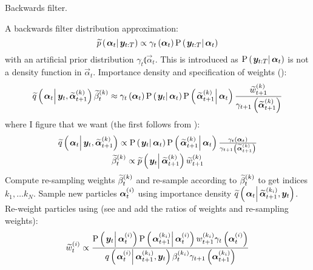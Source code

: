 \begin{algorithm}
\caption{Backwards filter.}\label{alg:backward}
\begin{algorithmic}[1]\raggedright
\INPUT
\Statex A backwards filter distribution approximation:
\begin{equation}
	\propAproxC{\vec{\alpha}_t}{\vec{y}_{t:T}} \propto \gamma_t \Lparen{\vec{\alpha}_t}\propC{\vec{y}_{t:T}}{\vec{\alpha}_t}
\end{equation} 
\Statex with an  artificial prior distribution $\gamma_t \Lparen{\vec{\alpha}_t}$. This is introduced as $\propC{\vec{y}_{t:T}}{\vec{\alpha}_t}$ is not a density function in $\vec{\alpha}_t$.
\Statex Importance density and specification of weights {\footnotesize (\citet[page 451 -- maybe look in the example in the appendix]{fearnhead10})}:
\Statex\begin{equation}
	\IDAproxC{\vec{\alpha}_t}{\vec{y}_t, \particB{\vec{\alpha}}{t + 1}{k}}\particB{\beta}{t}{k} \approx %
		\gamma_t\Lparen{\vec{\alpha}_t}
		\propC{\vec{y}_t}{\vec{\alpha}_t}
		\propC{\particB{\vec{\alpha}}{t + 1}{k}}{\vec{\alpha}_t}
		\frac{\particB{w}{t + 1}{k}}{\gamma_{t + 1}\Lparen{\particB{\vec{\alpha}}{t + 1}{k}}}
\end{equation}
\Statex where I figure that we want {\footnotesize (the first follows from \citet[page 74]{briers10})}:
\Statex\begin{equation}\begin{matrix}
	\IDAproxC{\vec{\alpha}_t}{\vec{y}_t, \particB{\vec{\alpha}}{t + 1}{k}} \propto %
		\propC{\vec{y}_t}{\vec{\alpha}_t}
		\propC{\particB{\vec{\alpha}}{t + 1}{k}}{\vec{\alpha}_t}
		\frac{\gamma_t\Lparen{\vec{\alpha}_t}}{\gamma_{t + 1}\Lparen{\particB{\vec{\alpha}}{t + 1}{k}}} \\
	\particB{\beta}{t}{k} \propto %
		 \propAproxC{\vec{y}_t}{\particB{\vec{\alpha}}{t + 1}{k}}\particB{w}{t + 1}{k}
\end{matrix}\end{equation}
\State Compute re-sampling weights $\widetilde{\beta}_{t}^{\left( k\right)}$ and re-sample according to $\widetilde{\beta}_{t}^{\left( k\right)}$ to get indices $k_1,\dots k_N$.
\EndProcedure
%
\State Sample new particles $\bm{\alpha}_{t}^{\left( i\right)}$ using importance density $\IDAproxC{\vec{\alpha}_t}{\particB{\vec{\alpha}}{t + 1}{k_i}, \vec{y}_t}$.
\EndProcedure
%
\State Re-weight particles using {\footnotesize (see \citet[page 72]{briers10} and add the ratios of weights and re-sampling weights)}:
\StateX \begin{equation}\label{eqn:backwardWeight}
	\particB{w}{t}{i} \propto \frac{
		\propC{\vec{y}_t}{\partic{\vec{\alpha}}{t}{i}}
		\propC{\partic{\vec{\alpha}}{t + 1}{k_i}}{\partic{\vec{\alpha}}{t}{i}}
		\partic{w}{t + 1}{k_i}
		\gamma_t\Lparen{\partic{\vec{\alpha}}{t}{i}}
	}{ %
		\IDC{\partic{\vec{\alpha}}{t}{i}}{\partic{\vec{\alpha}}{t + 1}{k_i}, \vec{y}_t}
		\partic{\beta}{t}{k_i}
		\gamma_{t + 1}\Lparen{\partic{\vec{\alpha}}{t + 1}{k_i}}
	}
\end{equation}
\EndProcedure
\EndFor
\end{algorithmic}
\end{algorithm}
